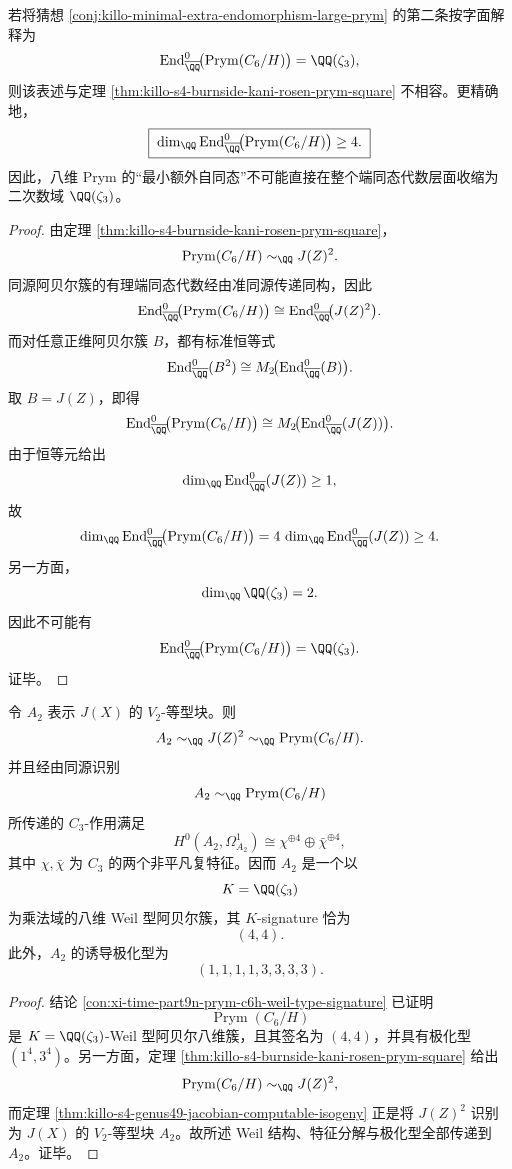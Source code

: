 \begin{conclusion}\label{con:xi-time-part9n-prym-c6h-endomorphism-obstruction}
若将猜想 \ref{conj:killo-minimal-extra-endomorphism-large-prym} 的第二条按字面解释为
\[
\operatorname{End}^0_{\overline{\QQ}}\!\bigl(\operatorname{Prym}(C_6/H)\bigr)=\QQ(\zeta_3),
\]
则该表述与定理 \ref{thm:killo-s4-burnside-kani-rosen-prym-square} 不相容。更精确地，
\[
\boxed{\;
\dim_{\QQ}
\operatorname{End}^0_{\overline{\QQ}}\!\bigl(\operatorname{Prym}(C_6/H)\bigr)
\ge 4.\;}
\]
因此，八维 Prym 的“最小额外自同态”不可能直接在整个端同态代数层面收缩为二次数域 \(\QQ(\zeta_3)\)。
\end{conclusion}
\begin{proof}
由定理 \ref{thm:killo-s4-burnside-kani-rosen-prym-square}，
\[
\operatorname{Prym}(C_6/H)\sim_{\QQ} J(Z)^2.
\]
同源阿贝尔簇的有理端同态代数经由准同源传递同构，因此
\[
\operatorname{End}^0_{\overline{\QQ}}\!\bigl(\operatorname{Prym}(C_6/H)\bigr)
\cong
\operatorname{End}^0_{\overline{\QQ}}\!\bigl(J(Z)^2\bigr).
\]
而对任意正维阿贝尔簇 \(B\)，都有标准恒等式
\[
\operatorname{End}^0_{\overline{\QQ}}(B^2)\cong
M_2\!\bigl(\operatorname{End}^0_{\overline{\QQ}}(B)\bigr).
\]
取 \(B=J(Z)\)，即得
\[
\operatorname{End}^0_{\overline{\QQ}}\!\bigl(\operatorname{Prym}(C_6/H)\bigr)
\cong
M_2\!\bigl(\operatorname{End}^0_{\overline{\QQ}}(J(Z))\bigr).
\]
由于恒等元给出
\[
\dim_{\QQ}\operatorname{End}^0_{\overline{\QQ}}(J(Z))\ge 1,
\]
故
\[
\dim_{\QQ}
\operatorname{End}^0_{\overline{\QQ}}\!\bigl(\operatorname{Prym}(C_6/H)\bigr)
=
4\,
\dim_{\QQ}\operatorname{End}^0_{\overline{\QQ}}(J(Z))
\ge 4.
\]
另一方面，
\[
\dim_{\QQ}\QQ(\zeta_3)=2.
\]
因此不可能有
\[
\operatorname{End}^0_{\overline{\QQ}}\!\bigl(\operatorname{Prym}(C_6/H)\bigr)=\QQ(\zeta_3).
\]
证毕。
\end{proof}

\begin{conclusion}\label{con:xi-time-part9n-v2-block-balanced-weil}
令 \(A_2\) 表示 \(J(X)\) 的 \(V_2\)-等型块。则
\[
A_2\sim_{\QQ}J(Z)^2\sim_{\QQ}\operatorname{Prym}(C_6/H).
\]
并且经由同源识别
\[
A_2\sim_{\QQ}\operatorname{Prym}(C_6/H)
\]
所传递的 \(C_3\)-作用满足
\[
H^0(A_2,\Omega_{A_2}^1)\cong \chi^{\oplus 4}\oplus \bar\chi^{\oplus 4},
\]
其中 \(\chi,\bar\chi\) 为 \(C_3\) 的两个非平凡复特征。因而 \(A_2\) 是一个以
\[
K=\QQ(\zeta_3)
\]
为乘法域的八维 Weil 型阿贝尔簇，其 \(K\)-signature 恰为
\[
\boxed{\;(4,4).\;}
\]
此外，\(A_2\) 的诱导极化型为
\[
(1,1,1,1,3,3,3,3).
\]
\end{conclusion}
\begin{proof}
结论 \ref{con:xi-time-part9n-prym-c6h-weil-type-signature} 已证明
\[
\operatorname{Prym}(C_6/H)
\]
是 \(K=\QQ(\zeta_3)\)-Weil 型阿贝尔八维簇，且其签名为 \((4,4)\)，并具有极化型 \((1^4,3^4)\)。另一方面，定理 \ref{thm:killo-s4-burnside-kani-rosen-prym-square} 给出
\[
\operatorname{Prym}(C_6/H)\sim_{\QQ}J(Z)^2,
\]
而定理 \ref{thm:killo-s4-genus49-jacobian-computable-isogeny} 正是将 \(J(Z)^2\) 识别为 \(J(X)\) 的 \(V_2\)-等型块 \(A_2\)。故所述 Weil 结构、特征分解与极化型全部传递到 \(A_2\)。证毕。
\end{proof}

